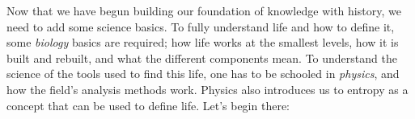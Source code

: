 Now that we have begun building our foundation of knowledge with history, we need to add some science basics.
To fully understand life and how to define it, some \emph{biology} basics are required; how life works at the smallest levels, how it is built and rebuilt, and what the different components mean.
To understand the science of the tools used to find this life, one has to be schooled in \emph{physics}, and how the field's analysis methods work.
Physics also introduces us to entropy as a concept that can be used to define life.
Let's begin there:
